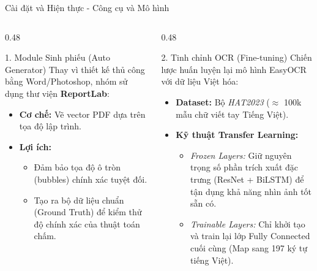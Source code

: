 \documentclass[10pt, aspectratio=169]{beamer}
\begin{document}
\begin{frame}{Cài đặt và Hiện thực - Công cụ và Mô hình}
	
	\begin{columns}[t]
		\begin{column}{0.48\textwidth}
			\begin{block}{1. Module Sinh phiếu (Auto Generator)}
				Thay vì thiết kế thủ công bằng Word/Photoshop, nhóm sử dụng thư viện \textbf{ReportLab}:
				\begin{itemize}
					\setlength\itemsep{0.5em}
					\item \textbf{Cơ chế:} Vẽ vector PDF dựa trên tọa độ lập trình.
					\item \textbf{Lợi ích:} 
					\begin{itemize} \footnotesize
						\item Đảm bảo tọa độ ô tròn (bubbles) chính xác tuyệt đối.
						\item Tạo ra bộ dữ liệu chuẩn (Ground Truth) để kiểm thử độ chính xác của thuật toán chấm.
					\end{itemize}
				\end{itemize}
			\end{block}
		\end{column}
		
		\begin{column}{0.48\textwidth}
			\begin{block}{2. Tinh chỉnh OCR (Fine-tuning)}
				Chiến lược huấn luyện lại mô hình EasyOCR với dữ liệu Việt hóa:
				\begin{itemize}
					\setlength\itemsep{0.5em}
					\item \textbf{Dataset:} Bộ \textit{HAT2023} ($\approx$ 100k mẫu chữ viết tay Tiếng Việt).
					\item \textbf{Kỹ thuật Transfer Learning:}
					\begin{itemize} \footnotesize
						\item \textit{Frozen Layers:} Giữ nguyên trọng số phần trích xuất đặc trưng (ResNet + BiLSTM) để tận dụng khả năng nhìn ảnh tốt sẵn có.
						\item \textit{Trainable Layers:} Chỉ khởi tạo và train lại lớp Fully Connected cuối cùng (Map sang 197 ký tự tiếng Việt).
					\end{itemize}
				\end{itemize}
			\end{block}
		\end{column}
	\end{columns}
	
\end{frame}
\end{document}
